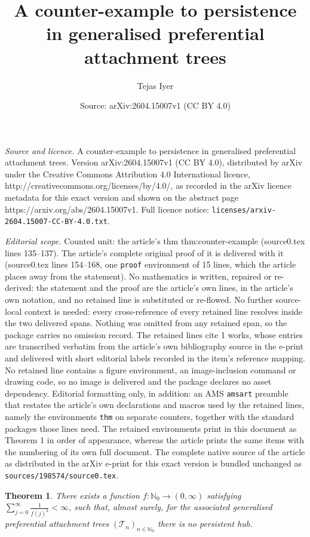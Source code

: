 \documentclass[10pt,a4paper]{amsart}
\title{A counter-example to persistence in generalised preferential attachment trees}
\author{Tejas Iyer}
\date{Source: arXiv:2604.15007v1 (CC BY 4.0)}
\newtheorem{thm}{Theorem}
\begin{document}
\maketitle

\noindent\emph{Source and licence.} A counter-example to persistence in generalised preferential attachment trees. Version arXiv:2604.15007v1 (CC BY 4.0), distributed by arXiv under the Creative Commons Attribution 4.0 International licence, http://creativecommons.org/licenses/by/4.0/, as recorded in the arXiv licence metadata for this exact version and shown on the abstract page https://arxiv.org/abs/2604.15007v1. Full licence notice: \texttt{licenses/arxiv-2604.15007-CC-BY-4.0.txt}.\par\smallskip

\noindent\textit{Editorial scope.} Counted unit: the article's thm thm:counter-example (source0.tex lines 135--137). The article's complete original proof of it is delivered with it (source0.tex lines 154--168, one \texttt{proof} environment of 15 lines, which the article places away from the statement). No mathematics is written, repaired or re-derived: the statement and the proof are the article's own lines, in the article's own notation, and no retained line is substituted or re-flowed.  No further source-local context is needed: every cross-reference of every retained line resolves inside the two delivered spans.  Nothing was omitted from any retained span, so the package carries no omission record.  The retained lines cite 1 works, whose entries are transcribed verbatim from the article's own bibliography source in the e-print and delivered with short editorial labels recorded in the item's reference mapping.  No retained line contains a figure environment, an image-inclusion command or drawing code, so no image is delivered and the package declares no asset dependency.  Editorial formatting only, in addition: an AMS \texttt{amsart} preamble that restates the article's own declarations and macros used by the retained lines, namely the environments \texttt{thm} on separate counters, together with the standard packages those lines need.  The retained environments print in this document as Theorem 1 in order of appearance, whereas the article prints the same items with the numbering of its own full document.  The complete native source of the article as distributed in the arXiv e-print for this exact version is bundled unchanged as \texttt{sources/198574/source0.tex}.
\begin{thm} \label{thm:counter-example}
    There exists a function $f\colon \mathbb{N}_0 \rightarrow (0,\infty)$ satisfying $\sum_{j=0}^{\infty} \frac{1}{f(j)^2} < \infty$, such that, almost surely, for the associated generalised preferential attachment trees $(\mathcal{T}_{n})_{n \in \mathbb{N}_0}$ there is no persistent hub. 
\end{thm}
\end{document}

